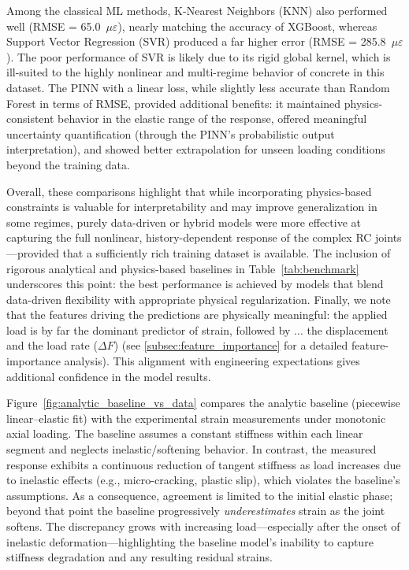 \documentclass{article}
\begin{document}
Among the classical ML methods, K-Nearest Neighbors (KNN) also performed well (RMSE = 65.0~$\mu\varepsilon$), nearly matching the accuracy of XGBoost, whereas Support Vector Regression (SVR) produced a far higher error (RMSE = 285.8~$\mu\varepsilon$). The poor performance of SVR is likely due to its rigid global kernel, which is ill-suited to the highly nonlinear and multi-regime behavior of concrete in this dataset. The PINN with a linear loss, while slightly less accurate than Random Forest in terms of RMSE, provided additional benefits: it maintained physics-consistent behavior in the elastic range of the response, offered meaningful uncertainty quantification (through the PINN’s probabilistic output interpretation), and showed better extrapolation for unseen loading conditions beyond the training data.

Overall, these comparisons highlight that while incorporating physics-based constraints is valuable for interpretability and may improve generalization in some regimes, purely data-driven or hybrid models were more effective at capturing the full nonlinear, history-dependent response of the complex RC joints—provided that a sufficiently rich training dataset is available. The inclusion of rigorous analytical and physics-based baselines in Table~\ref{tab:benchmark} underscores this point: the best performance is achieved by models that blend data-driven flexibility with appropriate physical regularization. Finally, we note that the features driving the predictions are physically meaningful: the applied load is by far the dominant predictor of strain, followed by ... the displacement and the load rate ($\Delta F$) (see \cref{subsec:feature_importance} for a detailed feature-importance analysis). This alignment with engineering expectations gives additional confidence in the model results.


Figure~\ref{fig:analytic_baseline_vs_data} compares the analytic baseline
(piecewise linear–elastic fit) with the experimental strain measurements under
monotonic axial loading. The baseline assumes a constant stiffness within each
linear segment and neglects inelastic/softening behavior. In contrast, the
measured response exhibits a continuous reduction of tangent stiffness as load
increases due to inelastic effects (e.g., micro-cracking, plastic slip), which
violates the baseline’s assumptions. As a consequence, agreement is limited to
the initial elastic phase; beyond that point the baseline progressively
\emph{underestimates} strain as the joint softens. The discrepancy grows with
increasing load—especially after the onset of inelastic deformation—highlighting
the baseline model’s inability to capture stiffness degradation and any
resulting residual strains.
\end{document}
